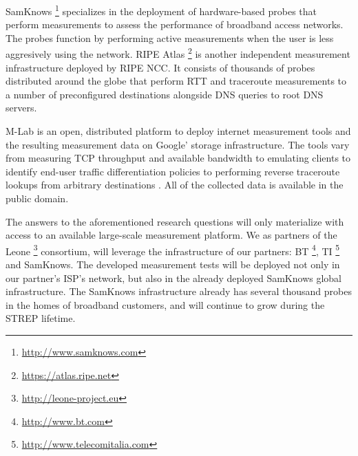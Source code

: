 SamKnows \footnote{\url{http://www.samknows.com}} specializes in the
deployment of hardware-based probes that perform measurements to assess the
performance of broadband access networks. The probes function by performing
active measurements when the user is less aggresively using the network.  RIPE
Atlas \footnote{\url{https://atlas.ripe.net}} is another independent
measurement infrastructure deployed by \ac{RIPE NCC}. It consists of thousands
of probes distributed around the globe that perform \ac{RTT} and traceroute
measurements to a number of preconfigured destinations alongside DNS queries
to root DNS servers.

\ac{M-Lab} \cite{dovrolis:2010} is an open, distributed platform to deploy
internet measurement tools and the resulting measurement data on Google'
storage infrastructure. The tools vary from measuring TCP throughput and
available bandwidth to emulating clients to identify end-user traffic
differentiation policies \cite{dischinger:2010, kanuparthy:2011} to performing
reverse traceroute lookups from arbitrary destinations \cite{bassett:2010}.
All of the collected data is available in the public domain.


The answers to the aforementioned research questions will only materialize
with access to an available large-scale measurement platform. We as partners
of the Leone \footnote{\url{http://leone-project.eu}} consortium, will
leverage the infrastructure of our partners: BT
\footnote{\url{http://www.bt.com}}, TI
\footnote{\url{http://www.telecomitalia.com}} and SamKnows. The developed
measurement tests will be deployed not only in our partner's ISP's network,
but also in the already deployed SamKnows global infrastructure.  The SamKnows
infrastructure already has several thousand probes in the homes of broadband
customers, and will continue to grow during the STREP lifetime.
